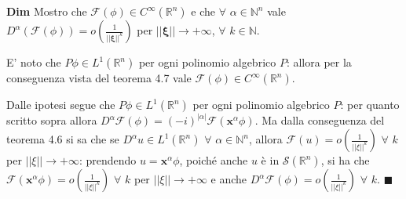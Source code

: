 \documentclass{article}
\begin{document}
\textbf{Dim} Mostro che $\mathcal{F}\left( \phi \right) \in C^{\infty
}\left( 
\mathbb{R}
^{n}\right) $ e che $\forall $ $\alpha \in 
\mathbb{N}
^{n}$ vale $D^{\alpha }\left( \mathcal{F}\left( \phi \right) \right)
=o\left( \frac{1}{\left\vert \left\vert \mathbf{\xi }\right\vert \right\vert
^{k}}\right) $ per $\left\vert \left\vert \mathbf{\xi }\right\vert
\right\vert \rightarrow +\infty $, $\forall $ $k\in 
\mathbb{N}
$.

E' noto che $P\phi \in L^{1}\left( 
\mathbb{R}
^{n}\right) $ per ogni polinomio algebrico $P$: allora per la conseguenza
vista del teorema 4.7 vale $\mathcal{F}\left( \phi \right) \in C^{\infty
}\left( 
\mathbb{R}
^{n}\right) $.

Dalle ipotesi segue che $P\phi \in L^{1}\left( 
\mathbb{R}
^{n}\right) $ per ogni polinomio algebrico $P$: per quanto scritto sopra
allora $D^{\alpha }\mathcal{F}\left( \phi \right) =\left( -i\right)
^{\left\vert \alpha \right\vert }\mathcal{F}\left( \mathbf{x}^{\alpha }\phi
\right) $. Ma dalla conseguenza del teorema 4.6 si sa che se $D^{\alpha
}u\in L^{1}\left( 
\mathbb{R}
^{n}\right) $ $\forall $ $\alpha \in 
\mathbb{N}
^{n}$, allora $\mathcal{F}\left( u\right) =o\left( \frac{1}{\left\vert
\left\vert \xi \right\vert \right\vert ^{k}}\right) $ $\forall $ $k$ per $%
\left\vert \left\vert \xi \right\vert \right\vert \rightarrow +\infty $:
prendendo $u=\mathbf{x}^{\alpha }\phi $, poich\'{e} anche $u$ \`{e} in $%
\mathcal{S}\left( 
\mathbb{R}
^{n}\right) $, si ha che $\mathcal{F}\left( \mathbf{x}^{\alpha }\phi \right)
=o\left( \frac{1}{\left\vert \left\vert \xi \right\vert \right\vert ^{k}}%
\right) $ $\forall $ $k$ per $\left\vert \left\vert \xi \right\vert
\right\vert \rightarrow +\infty $ e anche $D^{\alpha }\mathcal{F}\left( \phi
\right) =o\left( \frac{1}{\left\vert \left\vert \xi \right\vert \right\vert
^{k}}\right) $ $\forall $ $k$. $\blacksquare $
\end{document}
